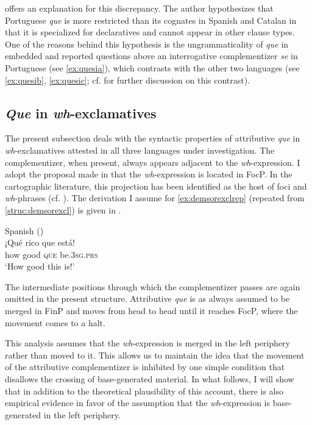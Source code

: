  \citet{Corr2016} offers an explanation for this discrepancy. The author hypothesizes that  Portuguese  \emph{que} is more restricted than its cognates  in Spanish and Catalan in that it is specialized for declaratives and cannot appear in other clause types.
 One of the reasons behind  this hypothesis is the ungrammaticality of  \emph{que} in embedded and reported questions above an interrogative complementizer \emph{se} in Portuguese (see  \ref{ex:quesia}), which contrasts with the other two languages (see \ref{ex:quesib}, \ref{ex:quesic}; cf.  for further discussion on this contrast). 





\subsection{\emph{Que} in \textit{wh}-exclamatives}\label{sec:presupexclc}
The present subsection deals with the syntactic properties of attributive \emph{que} in \textit{wh}-exclamatives attested in all three languages under investigation.  The complementizer, when present,  always appears adjacent to the \textit{wh}-expression. I adopt the proposal made in \citet{DemonteSoriano2009} that the \textit{wh}-ex\-pres\-sion is located in FocP. In the cartographic literature, this projection has been identified as the host of foci and \textit{wh}-phrases (cf. \citealt{Rizzi1997}). The derivation I assume for \eqref{ex:demsorexclrep} (repeated from \eqref{struc:demsorexcl}) is given in . 

\ea\label{ex:demsorexclrep}
		Spanish (\citealt[33 : ex 19a]{DemonteSoriano2009})\\
\gll   ¡Qué rico que está! \\
	 how good \textsc{que}   be.\textsc{3sg.prs}\\
	\glt `How good this is!'
\z

\begin{sloppypar}
The intermediate positions through which the complementizer passes are again omitted in the present structure.  Attributive \emph{que}  is as always assumed to be merged in FinP and moves from head to head until it reaches FocP, where the movement comes to a halt. 
\end{sloppypar}\largerpage[-2]

This analysis assumes that the \textit{wh}-expression is merged in the left periphery rather than moved to it. This allows us to maintain the idea that the movement of the attributive complementizer is inhibited by one simple condition that disallows the crossing of base-generated material. In what follows, I will show that in addition to the theoretical plausibility of this account,  there is also empirical evidence in favor of the assumption that the \textit{wh}-expression is base-generated in the left periphery. 

